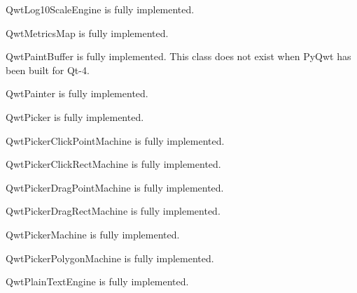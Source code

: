 \documentclass{manual}
\begin{document}
\begin{classdesc*}{QwtLog10ScaleEngine}
is fully implemented.
\end{classdesc*}

\begin{classdesc*}{QwtMetricsMap}
is fully implemented.
\end{classdesc*}

\begin{classdesc*}{QwtPaintBuffer}
  is fully implemented.
  This class does not exist when PyQwt has been built for Qt-4.
\end{classdesc*}

\begin{classdesc*}{QwtPainter}
  is fully implemented.
\end{classdesc*}

\begin{classdesc*}{QwtPicker}
  is fully implemented.
\end{classdesc*}

\begin{classdesc*}{QwtPickerClickPointMachine}
  is fully implemented.
\end{classdesc*}

\begin{classdesc*}{QwtPickerClickRectMachine}
  is fully implemented.
\end{classdesc*}

\begin{classdesc*}{QwtPickerDragPointMachine}
  is fully implemented.
\end{classdesc*}

\begin{classdesc*}{QwtPickerDragRectMachine}
  is fully implemented.
\end{classdesc*}

\begin{classdesc*}{QwtPickerMachine}
  is fully implemented.
\end{classdesc*}

\begin{classdesc*}{QwtPickerPolygonMachine}
  is fully implemented.
\end{classdesc*}

\begin{classdesc*}{QwtPlainTextEngine}
  is fully implemented.
\end{classdesc*}
\end{document}
